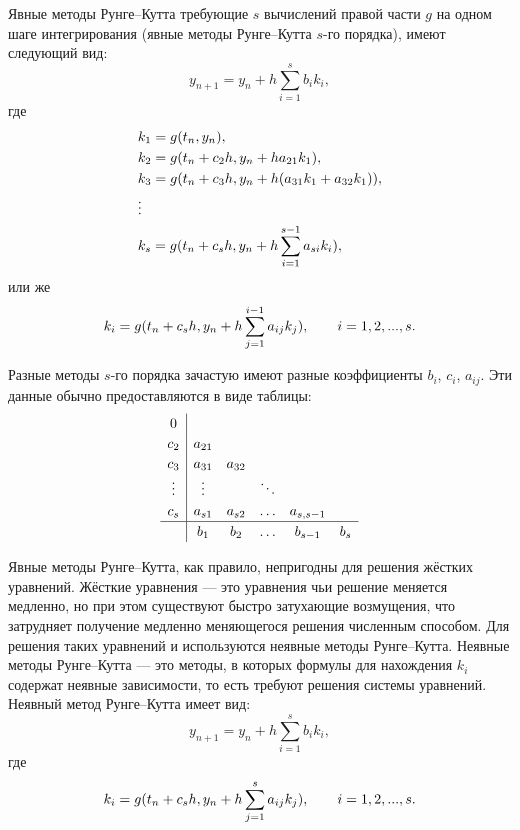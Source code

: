 \documentclass[a4paper,12pt]{article}
\begin{document}
	Явные методы Рунге--Кутта требующие \(s\) вычислений правой части \(g\) на одном шаге интегрирования  (явные методы Рунге--Кутта \(s\)-го порядка), имеют следующий вид:
	\begin{equation}
		y_{n+1}=y_n+h\sum_{i=1}^{s}b_ik_i,
	\end{equation}
	где
	\begin{equation}
		\begin{lgathered}
			k_1=g(t_n, y_n),\\
			k_2=g(t_n+c_2h, y_n+ha_{21}k_1),\\
			k_3=g(t_n+c_3h, y_n+h(a_{31}k_1+a_{32}k_1)),\\
			\vdots\\
			k_s=g(t_n+c_sh, y_n+h\sum_{i=1}^{s-1}a_{si}k_i),\\
		\end{lgathered}
	\end{equation}
	или же
	\begin{equation}
		k_i=g(t_n+c_sh, y_n+h\sum_{j=1}^{i-1}a_{ij}k_j),\qquad i=1,2,...,s.\\
	\end{equation}

	Разные методы \(s\)-го порядка зачастую имеют разные коэффициенты  \(b_i\), \(c_i\), \(a_{ij}\).  Эти данные обычно предоставляются в виде таблицы:
	\begin{equation*}
	\renewcommand\arraystretch{1.2}
	\begin{array}
		{c|ccccc}
		0\\
		c_2 &a_{21}\\
		c_3 &a_{31} &a_{32}\\
		\vdots &\vdots & &\ddots\\
		c_s& a_{s1} &a_{s2}& \ldots&a_{s,s-1}\\
		\hline
		& b_1 &b_2 &\ldots &b_{s-1} &b_s
	\end{array}
	\end{equation*}

	Явные методы Рунге--Кутта, как правило, непригодны для решения жёстких уравнений. Жёсткие уравнения --- это уравнения чьи решение меняется медленно, но при этом существуют быстро затухающие возмущения, что затрудняет получение медленно меняющегося решения численным способом. Для решения таких уравнений и используются неявные методы Рунге--Кутта. Неявные методы Рунге--Кутта --- это методы, в которых формулы для нахождения \(k_i\) содержат неявные зависимости, то есть требуют решения системы уравнений. Неявный метод Рунге--Кутта имеет вид:
	\begin{equation}
		y_{n+1}=y_n+h\sum_{i=1}^{s}b_ik_i,
	\end{equation}
	где
	\begin{equation}
		k_i=g(t_n+c_sh, y_n+h\sum_{j=1}^{s}a_{ij}k_j),\qquad i=1,2,...,s.\\
	\end{equation}
\end{document}
